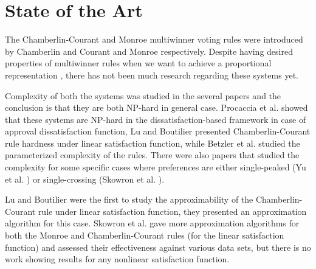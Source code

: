 \chapter{State of the Art}
\label{cha:stateArt}

The Chamberlin-Courant and Monroe multiwinner voting rules were introduced by Chamberlin and Courant \cite{9} and Monroe \cite{8} respectively. Despite having desired properties of multiwinner rules when we want to achieve a proportional representation \cite{10}, there has not been much research regarding these systems yet.

Complexity of both the systems was studied in the several papers and the conclusion is that they are both NP-hard in general case. Procaccia et al. \cite{2} showed that these systems are NP-hard in the dissatisfaction-based framework in case of approval dissatisfaction function, Lu and Boutilier \cite{4} presented Chamberlin-Courant rule hardness under linear satisfaction function, while Betzler et al. \cite{3} studied the parameterized complexity of the rules. There were also papers that studied the complexity for some specific cases where preferences are either single-peaked (Yu et al. \cite{11}) or single-crossing (Skowron et al. \cite{12}).

Lu and Boutilier \cite{4} were the first to study the approximability of the Chamberlin-Courant rule under linear satisfaction function, they presented an approximation algorithm for this case. Skowron et al. \cite{1} gave more approximation algorithms for both the Monroe and Chamberlin-Courant rules (for the linear satisfaction function) and assessed their effectiveness against various data sets, but there is no work showing results for any nonlinear satisfaction function.